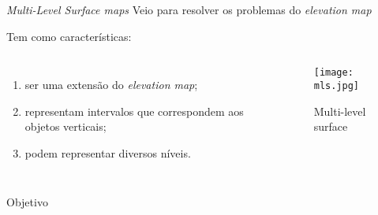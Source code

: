 \begin{frame}[t]{\textit{Multi-Level Surface maps}} 
    \transdissolve[duration=0.5]
    Veio para resolver os problemas do \textit{elevation map}
    
    Tem como características:
        \begin{columns}[t]
                \begin{enumerate}
                    \item ser uma extensão do \textit{elevation map};
                    \item representam intervalos que correspondem aos objetos verticais;
                    \item podem representar diversos níveis.
                \end{enumerate}
            \begin{center}
                \begin{figure}
                    \texttt{[image: mls.jpg]}
                    \caption{Multi-level surface\cite{article}}
                \end{figure}
            \end{center}
        \end{columns}
\end{frame}

\begin{frame}[c]{Objetivo} 
    \transdissolve[duration=0.5]
   
    \begin{center}
    \end{center}
    
\end{frame}

